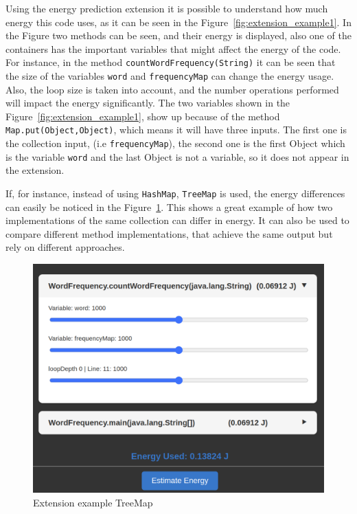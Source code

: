 Using the energy prediction extension it is possible to understand how much energy this code uses, as it can be seen in the Figure~\ref{fig:extension_example1}.
In the Figure two methods can be seen, and their energy is displayed, also one of the containers has the important variables that might affect the energy of the code. For instance, in the method \texttt{countWordFrequency(String)} it can be seen that the size of the variables \texttt{word} and \texttt{frequencyMap} can change the energy usage. Also, the loop size is taken into account, and the number operations performed will impact the energy significantly.
The two variables shown in the Figure~\ref{fig:extension_example1}, show up because of the method \texttt{Map.put(Object,Object)}, which means it will have three inputs. The first one is the collection input, (i.e \texttt{frequencyMap}), the second one is the first Object which is the variable \texttt{word} and the last Object is not a variable, so it does not appear in the extension.


If, for instance, instead of using \texttt{HashMap}, \texttt{TreeMap} is used, the energy differences can easily be noticed in the Figure~\ref{fig:extension_example2}. This shows a great example of how two implementations of the same collection can differ in energy. It can also be used to compare different method implementations, that achieve the same output but rely on different approaches.



\begin{figure}[htbp]
  \centering
  \includegraphics[width = .8 \textwidth]{figures/extension_example2.png}
  \caption{Extension example TreeMap}
  \label{fig:extension_example2}
\end{figure}



